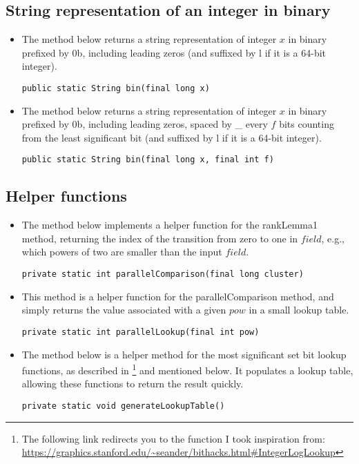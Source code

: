 \subsection{String representation of an integer in binary}

\begin{itemize}
    \item
    The method below returns a string representation of integer $x$ in binary prefixed by {\ttfamily 0b}, including leading zeros (and suffixed by {\ttfamily l} if it is a 64-bit integer).
    \begin{lstlisting}
public static String bin(final long x)
    \end{lstlisting}
    
    \item
    The method below returns a string representation of integer $x$ in binary prefixed by {\ttfamily 0b}, including leading zeros, spaced by {\ttfamily \_} every $f$ bits counting from the least significant bit (and suffixed by {\ttfamily l} if it is a 64-bit integer).
    \begin{lstlisting}
public static String bin(final long x, final int f)
    \end{lstlisting}
\end{itemize}

\subsection{Helper functions}

\begin{itemize}
    \item
    The method below implements a helper function for the {\ttfamily rankLemma1} method, returning the index of the transition from zero to one in $field$, e.g., which powers of two are smaller than the input $field$.
    \begin{lstlisting}
private static int parallelComparison(final long cluster)
    \end{lstlisting}

    \item
    This method is a helper function for the {\ttfamily parallelComparison} method, and simply returns the value associated with a given $pow$ in a small lookup table.
    \begin{lstlisting}
private static int parallelLookup(final int pow)
    \end{lstlisting}
    
    \item
    The method below is a helper method for the most significant set bit lookup functions, as described in \cite{bittricks}\footnote{The following link redirects you to the function I took inspiration from: \url{https://graphics.stanford.edu/~seander/bithacks.html\#IntegerLogLookup}} and mentioned below. It populates a lookup table, allowing these functions to return the result quickly. 
    \begin{lstlisting}
private static void generateLookupTable()
    \end{lstlisting}
\end{itemize}

